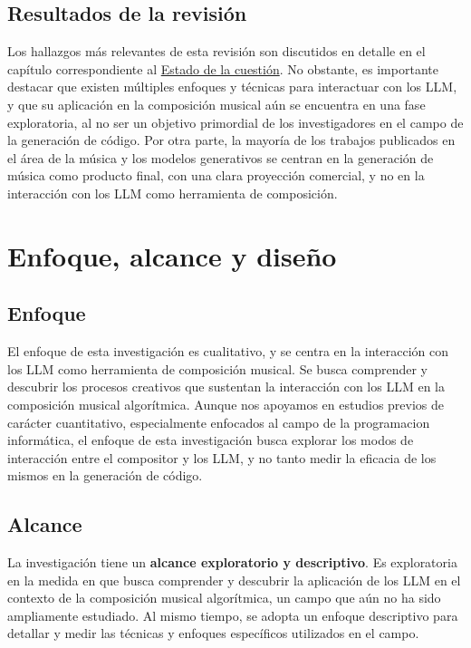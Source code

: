 \subsection{Resultados de la revisión}
Los hallazgos más relevantes de esta revisión son discutidos en detalle en el capítulo correspondiente al \hyperref[chap:estado_cuestion]{Estado de la cuestión}. No obstante, es importante destacar que existen múltiples enfoques y técnicas para interactuar con los LLM, y que su aplicación en la composición musical aún se encuentra en una fase exploratoria, al no ser un objetivo primordial de los investigadores en el campo de la generación de código. Por otra parte, la mayoría de los trabajos publicados en el área de la música y los modelos generativos se centran en la generación de música como producto final, con una clara proyección comercial, y no en la interacción con los LLM como herramienta de composición. 

\section{Enfoque, alcance y diseño}

\subsection{Enfoque}

El enfoque de esta investigación es cualitativo, y se centra en la interacción con los LLM como herramienta de composición musical. Se busca comprender y descubrir los procesos creativos que sustentan la interacción con los LLM en la composición musical algorítmica. Aunque nos apoyamos en estudios previos de carácter cuantitativo, especialmente enfocados al campo de la programacion informática, el enfoque de esta investigación busca explorar los modos de interacción entre el compositor y los LLM, y no tanto medir la eficacia de los mismos en la generación de código. 

\subsection{Alcance}
La investigación tiene un \textbf{alcance exploratorio y descriptivo}. Es exploratoria en la medida en que busca comprender y descubrir la aplicación de los LLM en el contexto de la composición musical algorítmica, un campo que aún no ha sido ampliamente estudiado. Al mismo tiempo, se adopta un enfoque descriptivo para detallar y medir las técnicas y enfoques específicos utilizados en el campo.


